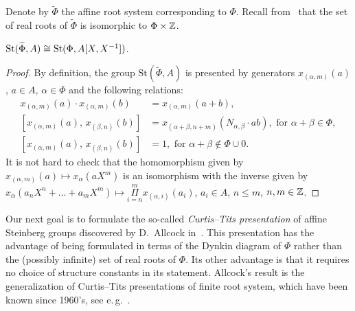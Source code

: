 Denote by $\widetilde{\Phi}$ the affine root system corresponding to $\Phi$.
Recall from~\cite[\S~4]{A16} that the set of real roots of $\widetilde{\Phi}$ is isomorphic to $\Phi \times \mathbb{Z}$.
\begin{lemma} \label{lem:affine-vs-loop} $\operatorname{St}(\widetilde{\Phi}, A) \cong \operatorname{St}(\Phi, A[X, X^{-1}])$.
\end{lemma}
\begin{proof}
    By definition, the group $\mathrm{St}(\widetilde{\Phi}, A)$ is presented by generators $x_{(\alpha, m)}(a)$, $a \in A$, $\alpha \in \Phi$ and
    the following relations:
    \begin{align}
        x_{(\alpha, m)}(a)\cdot x_{(\alpha, m)}(b)&=x_{(\alpha, m)}(a+b),  \label{AR1}\\
        [x_{(\alpha, m)}(a),\,x_{(\beta, n)}(b)]  &=x_{(\alpha+\beta, n+m)}(N_{\alpha,\beta} \cdot ab),\text{ for }\alpha+\beta\in\Phi, \label{AR2} \\
        [x_{(\alpha, m)}(a),\,x_{(\beta, n)}(b)]  &=1,\text{ for }\alpha+\beta\not\in\Phi\cup0. \label{AR3}
    \end{align}
    It is not hard to check that the homomorphism given by $x_{(\alpha, m)}(a) \mapsto x_\alpha(aX^m)$ is an isomorphism with the inverse given by
    $x_\alpha(a_{n}X^n + \ldots + a_m X^m) \mapsto \Pi\limits_{i=n}^m x_{(\alpha, i)}(a_i)$, $a_i \in A$, $n \leq m$, $n, m\in \mathbb{Z}$.
\end{proof}

Our next goal is to formulate the so-called \textit{Curtis--Tits presentation} of affine Steinberg groups discovered by D.~Allcock in~\cite{A16, A13}.
This presentation has the advantage of being formulated in terms of the Dynkin diagram of $\Phi$ rather than the (possibly infinite) set of real roots of $\Phi$.
Its other advantage is that it requires no choice of structure constants in its statement.
Allcock's result is the generalization of Curtis--Tits presentations of finite root system, which have been known since 1960's, see e.\,g.~\cite[Theorem~B]{DS74}.

